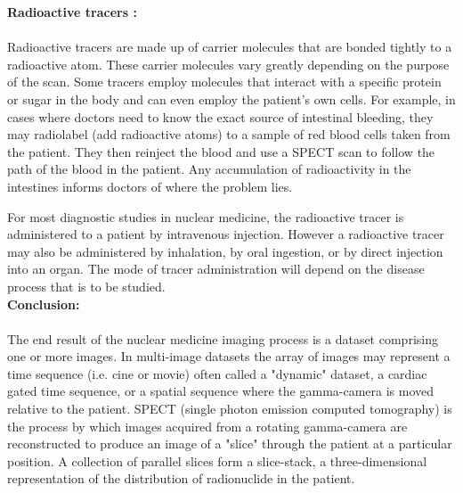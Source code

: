 \documentclass[12pt]{article}
\begin{document}
\noindent \textbf{\large Radioactive tracers :}\\ \\ Radioactive tracers are made up of carrier molecules that are bonded tightly to a radioactive atom. These carrier molecules vary greatly depending on the purpose of the scan. Some tracers employ molecules that interact with a specific protein or sugar in the body and can even employ the patient’s own cells. For example, in cases where doctors need to know the exact source of intestinal bleeding, they may radiolabel (add radioactive atoms) to a sample of red blood cells taken from the patient. They then reinject the blood and use a SPECT scan to follow the path of the blood in the patient. Any accumulation of radioactivity in the intestines informs doctors of where the problem lies.

For most diagnostic studies in nuclear medicine, the radioactive tracer is administered to a patient by intravenous injection. However a radioactive tracer may also be administered by inhalation, by oral ingestion, or by direct injection into an organ. The mode of tracer administration will depend on the disease process that is to be studied.\\

\noindent \textbf{\large Conclusion:} \\ \\ The end result of the nuclear medicine imaging process is a dataset comprising one or more images. In multi-image datasets the array of images may represent a time sequence (i.e. cine or movie) often called a "dynamic" dataset, a cardiac gated time sequence, or a spatial sequence where the gamma-camera is moved relative to the patient. SPECT (single photon emission computed tomography) is the process by which images acquired from a rotating gamma-camera are reconstructed to produce an image of a "slice" through the patient at a particular position. A collection of parallel slices form a slice-stack, a three-dimensional representation of the distribution of radionuclide in the patient.\\ \\
\end{document}
